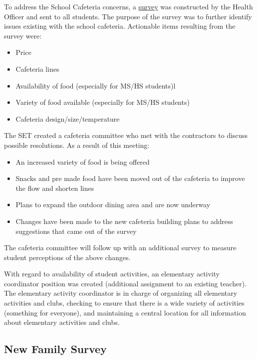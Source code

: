 
To address the School Cafeteria concerns, a \href{https://docs.google.com/a/cmis.ac.th/forms/d/18wFe46SOpPVv9_jkKLEa4OqVsDkLtJkUCcM85Jul0Ik/viewanalytics}{survey} was constructed by the Health Officer and sent to all students. The purpose of the survey was to further identify issues existing with the school cafeteria. Actionable items resulting from the survey were: 

\begin{itemize}
\item Price 
\item Cafeteria lines
\item Availability of food (especially for MS/HS students)l
\item Variety of food available (especially for MS/HS students) 
\item Cafeteria design/size/temperature
\end{itemize}


The SET created a cafeteria committee who met with the contractors to discuss possible resolutions. As a result of this meeting:
\begin{itemize}
\item An increased variety of food is being offered
\item Snacks and pre made food  have been moved out of the cafeteria to improve the flow and shorten lines
\item Plans to expand the outdoor dining area and are now underway
\item Changes have been made to the new cafeteria building plans to address suggestions that came out of the survey 
\end{itemize}

The cafeteria committee will follow up with an additional survey to measure student perceptions of the above changes.

With regard to availability of student activities, an elementary activity coordinator position was created (additional assignment to an existing teacher).  The elementary activity coordinator is in charge of organizing all elementary activities and clubs, checking to ensure that there is a wide variety of activities (something for everyone), and maintaining a central location for all information about elementary activities and clubs.

\subsection{New Family Survey}

